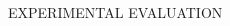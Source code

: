 \documentclass[%
  final,%
  english,%
]{beamer}
\begin{document}
\begin{frame}[t, fragile = singleslide]
\begin{columns}[t, onlytextwidth]
\begin{column}{\textwidth}
\begin{block}{EXPERIMENTAL EVALUATION}
\begin{columns}
\begin{column}{0.48\textwidth}
\end{column}

\begin{column}{0.45\textwidth}
\begin{itemize}


\end{itemize}
\end{column}
\end{columns}
\end{block}
\end{column}
\end{columns}
\end{frame}
\end{document}
